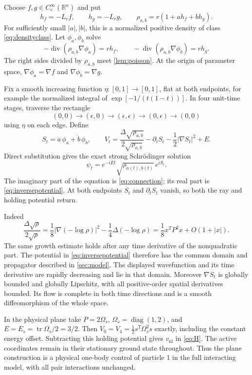 \documentclass[11pt]{article}
\numberwithin{equation}{section}
\theoremstyle{definition}
\newcommand{\R}{\mathbb R}
\newcommand{\Cc}{C_c^\infty}
\newcommand{\diver}{\operatorname{div}}
\newcommand{\tr}{\operatorname{tr}}
\newcommand{\diag}{\operatorname{diag}}
\begin{document}
Choose $f,g\in\Cc(\R^n)$ and put
\[
 h_f=-L_rf,\qquad h_g=-L_rg,\qquad
 \rho_{a,b}=r(1+a h_f+b h_g).
\]
For sufficiently small $|a|,|b|$, this is a normalized positive density
of class \eqref{eq:densityclass}. Let $\phi_a,\phi_b$ solve
\begin{equation}\label{eq:connection}
 -\diver(\rho_{a,b}\nabla\phi_a)=r h_f,\qquad
 -\diver(\rho_{a,b}\nabla\phi_b)=r h_g .
\end{equation}
The right sides divided by $\rho_{a,b}$ meet \cref{lem:poisson}.
At the origin of parameter space, $\nabla\phi_a=\nabla f$ and
$\nabla\phi_b=\nabla g$.

Fix a smooth increasing function $\eta:[0,1]\to[0,1]$, flat at both
endpoints, for example the normalized integral of
$\exp[-1/(t(1-t))]$. In four unit-time stages, traverse the rectangle
\[
 (0,0)\longrightarrow(\epsilon,0)\longrightarrow
 (\epsilon,\epsilon)\longrightarrow(0,\epsilon)
 \longrightarrow(0,0)
\]
using $\eta$ on each edge. Define
\begin{equation}\label{eq:inversepotential}
 S_t=\dot a\,\phi_a+\dot b\,\phi_b,\qquad
 V_t=\frac{\Delta\sqrt{\rho_{a,b}}}{2\sqrt{\rho_{a,b}}}
       -\partial_tS_t-\frac12|\nabla S_t|^2+E .
\end{equation}
Direct substitution gives the exact strong Schr\"odinger solution
\begin{equation}\label{eq:exactpath}
 \psi_t=e^{-iEt}\sqrt{\rho_{a(t),b(t)}}\,e^{iS_t}.
\end{equation}
The imaginary part of the equation is \eqref{eq:connection}; its real
part is \eqref{eq:inversepotential}. At both endpoints $S_t$ and
$\partial_tS_t$ vanish, so both the ray and holding potential return.

Indeed
\[
 \frac{\Delta\sqrt{\rho}}{2\sqrt{\rho}}
   =\frac18|\nabla(-\log\rho)|^2-\frac14\Delta(-\log\rho)
   =\frac18 x^TP^2x+O(1+|x|).
\]
The same growth estimate holds after any time derivative of the
nonquadratic part. The potential in \eqref{eq:inversepotential}
therefore has the common domain and propagator described in
\cref{sec:model}. The displayed wavefunction and its time derivative
are rapidly decreasing and lie in that domain.
Moreover $\nabla S_t$ is globally bounded and globally Lipschitz,
with all positive-order spatial derivatives bounded. Its flow is
complete in both time directions and is a smooth diffeomorphism
of the whole space.

In the physical plane take $P=2\Omega_s$, $\Omega_s=\diag(1,2)$,
and $E=E_s=\tr\Omega_s/2=3/2$.
Then $V_0=V_4=\tfrac12s^T\Omega_s^2s$ exactly, including the
constant energy offset. Subtracting this holding potential gives
$v_{\mathrm{nl}}$ in \eqref{eq:H}. The active coordinates remain in
their stationary ground state throughout. Thus the plane construction
is a physical one-body control of particle 1 in the full interacting
model, with all pair interactions unchanged.
\end{document}
